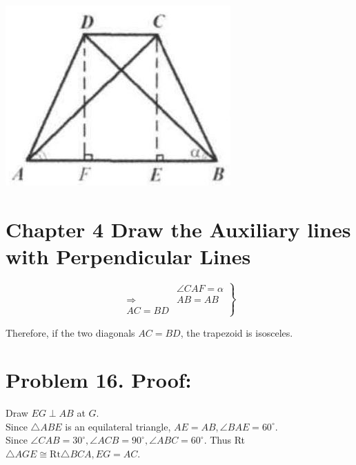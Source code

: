 \documentclass[10pt]{article}
\begin{document}
\begin{center}
\includegraphics[max width=\textwidth]{2025_04_17_97bc1f7e44d93c271a88g-097}
\end{center}

\section*{Chapter 4 Draw the Auxiliary lines with Perpendicular Lines}
\[
\left.\begin{array}{rl} 
& \angle C A F=\alpha \\
\Rightarrow & A B=A B \\
A C=B D
\end{array}\right\}
\]

Therefore, if the two diagonals \(A C=B D\), the trapezoid is isosceles.

\section*{Problem 16. Proof:}
Draw \(E G \perp A B\) at \(G\).\\
Since \(\triangle A B E\) is an equilateral triangle, \(A E=A B, \angle B A E=60^{\circ}\).\\
Since \(\angle C A B=30^{\circ}, \angle A C B=90^{\circ}, \angle A B C=60^{\circ}\). Thus Rt \(\triangle A G E \cong \mathrm{Rt} \triangle B C A, E G=A C\).
\end{document}

